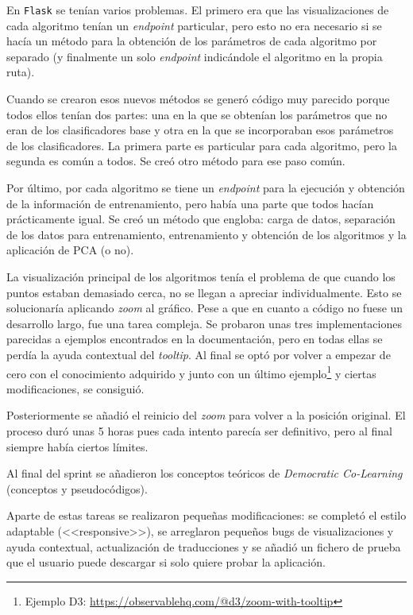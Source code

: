 En \texttt{Flask} se tenían varios problemas. El primero era que las
visualizaciones de cada algoritmo tenían un \textit{endpoint} particular, pero
esto no era necesario si se hacía un método para la obtención de los parámetros
de cada algoritmo por separado (y finalmente un solo \textit{endpoint}
indicándole el algoritmo en la propia ruta). 

Cuando se crearon esos nuevos métodos se generó código muy parecido porque todos
ellos tenían dos partes: una en la que se obtenían los parámetros que no eran de
los clasificadores base y otra en la que se incorporaban esos parámetros de los
clasificadores. La primera parte es particular para cada algoritmo, pero la
segunda es común a todos. Se creó otro método para ese paso común. 

Por último, por cada algoritmo se tiene un \textit{endpoint} para la ejecución y
obtención de la información de entrenamiento, pero había una parte que todos
hacían prácticamente igual. Se creó un método que engloba: carga de datos,
separación de los datos para entrenamiento, entrenamiento y obtención de los
algoritmos y la aplicación de PCA (o no).

La visualización principal de los algoritmos tenía el problema de que cuando los
puntos estaban demasiado cerca, no se llegan a apreciar individualmente. Esto se
solucionaría aplicando \textit{zoom} al gráfico. Pese a que en cuanto a código
no fuese un desarrollo largo, fue una tarea compleja. Se probaron unas tres
implementaciones parecidas a ejemplos encontrados en la documentación, pero en
todas ellas se perdía la ayuda contextual del \textit{tooltip}. Al final se optó
por volver a empezar de cero con el conocimiento adquirido y junto con un último
ejemplo\footnote{Ejemplo D3:
\url{https://observablehq.com/@d3/zoom-with-tooltip}} y ciertas modificaciones,
se consiguió. 

Posteriormente se añadió el reinicio del \textit{zoom} para volver a la posición
original. El proceso duró unas 5 horas pues cada intento parecía ser definitivo,
pero al final siempre había ciertos límites.

Al final del sprint se añadieron los conceptos teóricos de \textit{Democratic
Co-Learning} (conceptos y pseudocódigos).

Aparte de estas tareas se realizaron pequeñas modificaciones: se completó el
estilo adaptable (<<responsive>>), se arreglaron pequeños bugs de
visualizaciones y ayuda contextual, actualización de traducciones y se añadió un
fichero de prueba que el usuario puede descargar si solo quiere probar la
aplicación.

